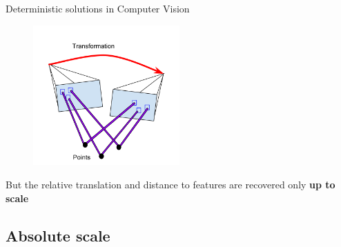 \documentclass{beamer}
\begin{document}
\begin{frame}{Deterministic solutions in Computer Vision}

\begin{figure}
\centering
\includegraphics[width=0.5\textwidth]{images/directMethod.png}
\end{figure}



But the relative translation and distance to features are recovered only \textbf{up to scale}

\end{frame}

\subsection{Absolute scale}
\end{document}
